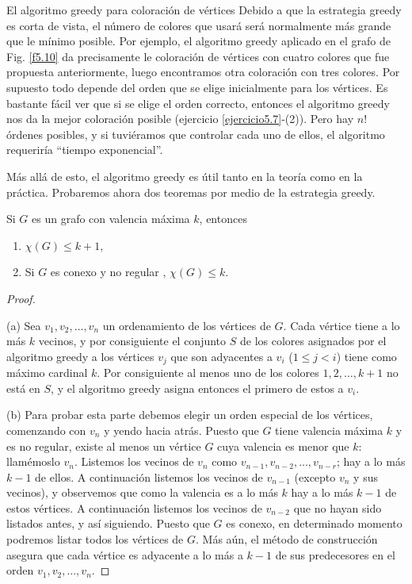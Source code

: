 \begin{section}{El algoritmo greedy para coloración de vértices}
Debido a que la estrategia greedy es corta de vista, el número de
colores que usará será normalmente más grande que le mínimo
posible. Por ejemplo, el algoritmo greedy aplicado en el grafo de
Fig. \ref{f5.10} da precisamente le coloración de vértices con
cuatro colores que fue propuesta anteriormente, luego encontramos
otra coloración con tres colores. Por supuesto todo depende del
orden que se elige inicialmente para los vértices. Es bastante
fácil ver que si se elige el orden correcto, entonces el algoritmo
greedy nos da la mejor coloración posible (ejercicio
\ref{ejercicio5.7}-(2)). Pero hay $n!$ órdenes
posibles, y si tuviéramos que controlar cada uno de ellos, el
algoritmo requeriría ``tiempo exponencial''.

Más allá de esto, el algoritmo greedy es útil tanto en la teoría
como en la práctica. Probaremos ahora dos teoremas por medio de la
estrategia greedy.

\begin{teorema}\label{t5.7.1} Si $G$ es un grafo con valencia máxima
$k$, entonces
\begin{enumerate}[label=(\alph*)]
\item  $\chi(G)\le k+1$,
\item  Si $G$ es conexo y no regular , $\chi(G) \le k$.
\end{enumerate}
\end{teorema}
\begin{proof}
	\

\noindent (a) Sea $v_1,v_2,\ldots,v_n$ un ordenamiento de los vértices
de $G$. Cada vértice tiene a lo más $k$ vecinos, y por
consiguiente el conjunto $S$ de los colores asignados por el
algoritmo greedy a los vértices $v_j$ que son adyacentes a $v_i$
($1\le j <i$) tiene como máximo cardinal $k$. Por consiguiente al
menos uno de los colores $1,2,\dots,k+1$ no está en $S$, y el
algoritmo greedy asigna entonces el primero de estos a $v_i$.

\noindent (b) Para probar esta parte debemos elegir un orden especial de
los vértices, comenzando con $v_n$ y yendo hacia atrás. Puesto que
$G$ tiene valencia máxima $k$ y es no regular, existe al menos un
vértice $G$ cuya valencia es menor que $k$: llamémoslo $v_n$.
Listemos los vecinos de $v_n$ como
$v_{n-1},v_{n-2},\ldots,v_{n-r}$; hay a lo más $k-1$ de ellos. A
continuación listemos los vecinos de $v_{n-1}$ (excepto $v_n$ y
sus vecinos), y observemos que como la valencia es a lo más $k$
hay a lo más $k-1$ de estos vértices. A continuación listemos los
vecinos de $v_{n-2}$ que no hayan sido listados antes, y así
siguiendo. Puesto que $G$ es conexo, en determinado momento
podremos listar todos los vértices de $G$. Más aún, el método de
construcción asegura que cada vértice es adyacente a lo más a
$k-1$ de sus predecesores en el orden $v_1,v_2,\ldots,v_n$.


\end{proof}
\end{section}
